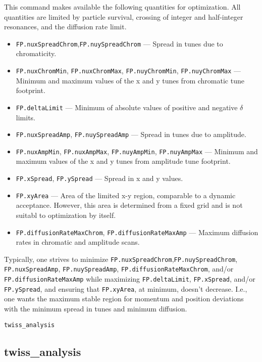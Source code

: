 \documentclass[11pt]{article}
\begin{document}
This command makes available the following quantities for optimization. All quantities are limited by 
particle survival, crossing of integer and half-integer resonances,  and the diffusion rate limit.
\begin{itemize}
\item \verb|FP.nuxSpreadChrom|,\verb|FP.nuySpreadChrom| --- Spread in tunes due to chromaticity.
\item \verb|FP.nuxChromMin|, \verb|FP.nuxChromMax|, \verb|FP.nuyChromMin|, \verb|FP.nuyChromMax| --- Minimum and maximum
  values of the x and y tunes from chromatic tune footprint.
\item \verb|FP.deltaLimit| --- Minimum of absolute values of positive and negative $\delta$ limits. 
\item \verb|FP.nuxSpreadAmp|, \verb|FP.nuySpreadAmp| --- Spread in tunes due to amplitude.
\item \verb|FP.nuxAmpMin|, \verb|FP.nuxAmpMax|, \verb|FP.nuyAmpMin|, \verb|FP.nuyAmpMax| --- Minimum and maximum
  values of the x and y tunes from amplitude tune footprint.
\item \verb|FP.xSpread|, \verb|FP.ySpread| --- Spread in x and y values.
\item \verb|FP.xyArea| --- Area of the limited x-y region, comparable to a dynamic acceptance. However, this area is determined from a
fixed grid and is not suitabl to optimization by itself.
\item \verb|FP.diffusionRateMaxChrom|, \verb|FP.diffusionRateMaxAmp| --- Maximum diffusion rates in chromatic and amplitude scans.
\end{itemize}
Typically, one strives to minimize \verb|FP.nuxSpreadChrom|,\verb|FP.nuySpreadChrom|, 
\verb|FP.nuxSpreadAmp|, \verb|FP.nuySpreadAmp|, \verb|FP.diffusionRateMaxChrom|, 
and/or \verb|FP.diffusionRateMaxAmp| 
while maximizing \verb|FP.deltaLimit|, \verb|FP.xSpread|, and/or \verb|FP.ySpread|,  and
ensuring that \verb|FP.xyArea|, at minimum, doesn't decrease.
I.e., one wants the maximum stable region for momentum and position deviations with the minimum spread in tunes and minimum diffusion.

\newpage
\begin{center}{\Large\verb|twiss_analysis|}\end{center}
\subsection{twiss\_analysis \label{subsec:twissanalysis}}
\end{document}
